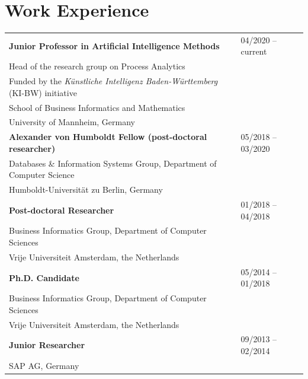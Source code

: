 \section{Work Experience}
\begin{tabular}{p{12.5cm}l}
		\normalsize \textbf{Junior Professor in Artificial Intelligence Methods} & 		04/2020 -- current\\
		Head of the research group on Process Analytics \\
			Funded by the \textit{Künstliche Intelligenz Baden-Württemberg} (KI-BW) initiative \\ 
 School of Business Informatics and Mathematics \\
 	University of Mannheim, Germany \\
	\noalign{\smallskip\smallskip}
	
	\normalsize \textbf{Alexander von Humboldt Fellow (post-doctoral researcher)} & 			05/2018  --  03/2020 \\
	Databases \& Information Systems Group, Department of Computer Science\\
		Humboldt-Universit\"at zu Berlin, Germany \\
	\noalign{\smallskip\smallskip}
	
	\normalsize \textbf{Post-doctoral Researcher} & 		01/2018  --  04/2018 \\
	Business Informatics Group, Department of Computer Sciences \\
		Vrije Universiteit Amsterdam, the Netherlands \\
	\noalign{\smallskip\smallskip}
	
	
	\normalsize \textbf{Ph.D. Candidate} & 05/2014  --  01/2018 \\
	Business Informatics Group, Department of Computer Sciences \\
	Vrije Universiteit Amsterdam, the Netherlands \\
	\noalign{\smallskip\smallskip}
	
	\normalsize \textbf{Junior Researcher} & 09/2013  --  02/2014 \\
	SAP AG, Germany \\
	
\end{tabular}


\medskip
\vspace{0.3em}
